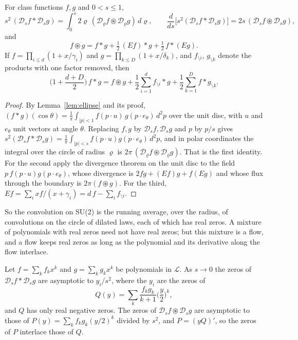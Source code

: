 \begin{theorem}\label{thm:radialflow}
For class functions $f,g$ and $0<s\le1$,
\[
s^2\,(\mathcal D_sf*\mathcal D_sg)=\int_0^s2\varrho\,(\mathcal D_\varrho f\circledast \mathcal D_\varrho g)\,d\varrho,\qquad\frac{d}{ds}\big[s^2(\mathcal D_sf*\mathcal D_sg)\big]=2s\,(\mathcal D_sf\circledast \mathcal D_sg),
\]
and
\[
f\circledast g=f*g+\tfrac12\,(Ef)*g+\tfrac12\,f*(Eg).
\]
If $f=\prod_{i\le d}(1+x/\gamma_i)$ and $g=\prod_{k\le D}(1+x/\delta_k)$, and $f_{\setminus i}$, $g_{\setminus k}$ denote the products with one factor removed, then
\[
\Big(1+\frac{d+D}{2}\Big)\,f*g=f\circledast g+\frac12\sum_{i=1}^df_{\setminus i}*g+\frac12\sum_{k=1}^Df*g_{\setminus k}.
\]
\end{theorem}

\begin{proof}
By Lemma~\ref{lem:ellipse} and its proof, $(f*g)(\cos\theta)=\frac1\pi\int_{|p|<1}f(p\cdot u)\,g(p\cdot e_\theta)\,d^2p$ over the unit disc, with $u$ and $e_\theta$ unit vectors at angle $\theta$. Replacing $f,g$ by $\mathcal D_sf,\mathcal D_sg$ and $p$ by $p/s$ gives $s^2(\mathcal D_sf*\mathcal D_sg)=\frac1\pi\int_{|p|<s}f(p\cdot u)g(p\cdot e_\theta)\,d^2p$, and in polar coordinates the integral over the circle of radius $\varrho$ is $2\pi\,(\mathcal D_\varrho f\circledast \mathcal D_\varrho g)$. That is the first identity. For the second apply the divergence theorem on the unit disc to the field $p\,f(p\cdot u)g(p\cdot e_\theta)$, whose divergence is $2fg+(Ef)g+f(Eg)$ and whose flux through the boundary is $2\pi(f\circledast g)$. For the third, $Ef=\sum_ixf/(x+\gamma_i)=d\,f-\sum_if_{\setminus i}$.
\end{proof}

So the convolution on SU(2) is the running average, over the radius, of convolutions on the circle of dilated laws, each of which has real zeros. A mixture of polynomials with real zeros need not have real zeros; but this mixture is a flow, and a flow keeps real zeros as long as the polynomial and its derivative along the flow interlace.

\begin{proposition}\label{prop:flatlimit}
Let $f=\sum_kf_kx^k$ and $g=\sum_kg_kx^k$ be polynomials in $\mathcal L$. As $s\to0$ the zeros of $\mathcal D_sf*\mathcal D_sg$ are asymptotic to $y_i/s^2$, where the $y_i$ are the zeros of
\[
Q(y)=\sum_k\frac{f_kg_k}{k+1}\Big(\frac y2\Big)^k,
\]
and $Q$ has only real negative zeros. The zeros of $\mathcal D_sf\circledast \mathcal D_sg$ are asymptotic to those of $P(y)=\sum_kf_kg_k(y/2)^k$ divided by $s^2$, and $P=(yQ)'$, so the zeros of $P$ interlace those of $Q$.
\end{proposition}

